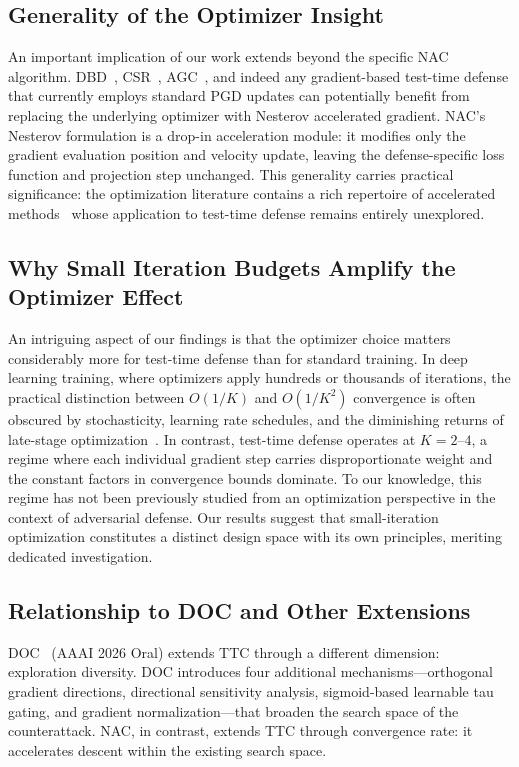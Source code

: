 \documentclass[12pt,a4paper]{article}
\begin{document}
\subsection{Generality of the Optimizer Insight}

An important implication of our work extends beyond the specific NAC algorithm. DBD~\cite{liu2026directional}, CSR~\cite{nie2025contrastive}, AGC~\cite{li2026agc}, and indeed any gradient-based test-time defense that currently employs standard PGD updates can potentially benefit from replacing the underlying optimizer with Nesterov accelerated gradient. NAC's Nesterov formulation is a drop-in acceleration module: it modifies only the gradient evaluation position and velocity update, leaving the defense-specific loss function and projection step unchanged. This generality carries practical significance: the optimization literature contains a rich repertoire of accelerated methods~\cite{nesterov1983method,ghadimi2016accelerated} whose application to test-time defense remains entirely unexplored.

\subsection{Why Small Iteration Budgets Amplify the Optimizer Effect}

An intriguing aspect of our findings is that the optimizer choice matters considerably more for test-time defense than for standard training. In deep learning training, where optimizers apply hundreds or thousands of iterations, the practical distinction between $O(1/K)$ and $O(1/K^2)$ convergence is often obscured by stochasticity, learning rate schedules, and the diminishing returns of late-stage optimization~\cite{kingma2015adam}. In contrast, test-time defense operates at $K=2$--$4$, a regime where each individual gradient step carries disproportionate weight and the constant factors in convergence bounds dominate. To our knowledge, this regime has not been previously studied from an optimization perspective in the context of adversarial defense. Our results suggest that small-iteration optimization constitutes a distinct design space with its own principles, meriting dedicated investigation.

\subsection{Relationship to DOC and Other Extensions}

DOC~\cite{jiang2026diversifying} (AAAI 2026 Oral) extends TTC through a different dimension: exploration diversity. DOC introduces four additional mechanisms---orthogonal gradient directions, directional sensitivity analysis, sigmoid-based learnable tau gating, and gradient normalization---that broaden the search space of the counterattack. NAC, in contrast, extends TTC through convergence rate: it accelerates descent within the existing search space.
\end{document}
